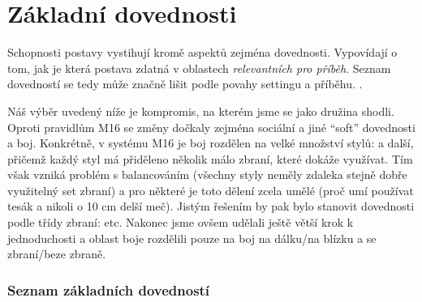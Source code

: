 \documentclass[../main.tex]{subfiles}
\begin{document}
\chapter{Základní dovednosti}
\label{chap:dovednosti}

Schopnosti postavy vystihují kromě aspektů zejména dovednosti. Vypovídají o tom, jak je která postava zdatná v oblastech \textit{relevantních pro příběh}. Seznam dovedností se tedy může značně lišit podle povahy settingu a příběhu. .

Náš výběr uvedený níže je kompromis, na kterém jsme se jako družina shodli. Oproti pravidlům M16 se změny dočkaly zejména sociální a jiné ``soft'' dovednosti a boj. Konkrétně, v systému M16 je boj rozdělen na velké množství stylů:  a další, přičemž každý styl má přiděleno několik málo zbraní, které dokáže využívat. Tím však vzniká problém s balancováním (všechny styly neměly zdaleka stejně dobře využitelný set zbraní) a pro některé je toto dělení zcela umělé (proč  umí používat tesák a nikoli o 10 cm delší meč). Jistým řešením by pak bylo stanovit dovednosti podle třídy zbraní:  etc. Nakonec jsme ovšem udělali ještě větší krok k jednoduchosti  a oblast boje rozdělili pouze na boj na dálku/na blízku a se zbraní/beze zbraně. 


\subsection{Seznam základních dovedností}
\label{sec:seznam-dov}
\end{document}
